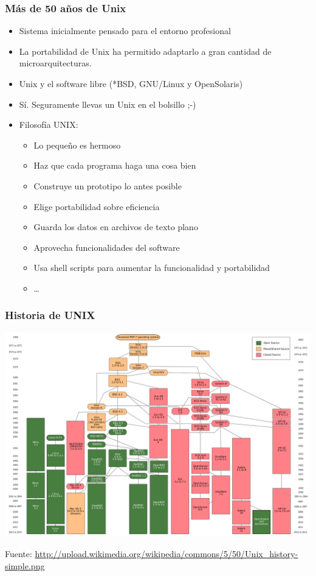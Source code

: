 \documentclass{beamer}
\begin{document}
\begin{frame}
  \frametitle{Más de 50 años de Unix}
  \begin{center}
    \begin{itemize}
    \item Sistema inicialmente pensado para el entorno profesional
    \item La portabilidad de Unix ha permitido adaptarlo a gran cantidad de
      microarquitecturas.
    \item Unix y el software libre (*BSD, GNU/Linux y OpenSolaris)
    \item Sí. Seguramente llevas un Unix en el bolsillo ;-)
    \item Filosofía UNIX:
      \begin{itemize}
      \item Lo pequeño es hermoso
      \item Haz que cada programa haga una cosa bien
      \item Construye un prototipo lo antes posible
      \item Elige portabilidad sobre eficiencia
      \item Guarda los datos en archivos de texto plano
      \item Aprovecha funcionalidades del software
      \item Usa shell scripts para aumentar la funcionalidad y portabilidad
      \item \ldots
      \end{itemize}
    \end{itemize}
  \end{center}
\end{frame}

\begin{frame} \frametitle{Historia de UNIX}
  \begin{center}
    \includegraphics[width=.85\textwidth]{img/Unix_history-simple.png}
\end{center}\tiny{Fuente: \url{http://upload.wikimedia.org/wikipedia/commons/5/50/Unix_history-simple.png}}
\end{frame}
\end{document}
